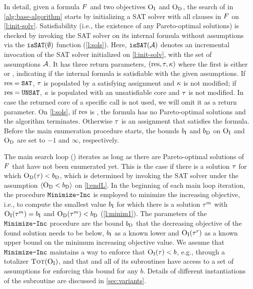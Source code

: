 In detail, given a formula $F$ and two objectives $\textsc{O}_{\text{I}}$ and $\textsc{O}_{\text{D}}$, the search of \algname{} in \cref{alg:base-algorithm} starts by initializing a SAT solver with all clauses in $F$ on \cref{l:init-solv}.
Satisfiability (i.e., the existence of any Pareto-optimal solutions) is checked by invoking the SAT solver on its internal formula without assumptions via the $\texttt{isSAT}(\emptyset)$ function (\cref{l:sols}).
Here, $\texttt{isSAT}(\mathcal{A})$ denotes an incremental invocation of the SAT solver initialized on \cref{l:init-solv}, with the set of assumptions $\mathcal{A}$.
It has three return parameters, $(\text{res},\tau,\kappa)$ where the first is either \sat{} or \unsat{}, indicating if the internal formula is satisfiable with the given assumptions.
If $\text{res}=\texttt{SAT}$, $\tau$ is populated by a satisfying assignment and $\kappa$ is not modified;
if $\text{res}=\texttt{UNSAT}$, $\kappa$ is populated with an unsatisfiable core and $\tau$ is not modified.
In case the returned core of a specific call is not used, we will omit it as a return parameter.
On \cref{l:sols}, if $\text{res}$ is \unsat{}, the formula has no Pareto-optimal solutions and the algorithm terminates.
Otherwise $\tau$ is an assignment that satisfies the formula.
Before the main enumeration procedure starts, the bounds $b_{\text{I}}$ and $b_{\text{D}}$ on $\textsc{O}_{\text{I}}$ and $\textsc{O}_{\text{D}}$ are set to $-1$ and $\infty$, respectively.

The main search loop () iterates as long as there are Pareto-optimal solutions of $F$ that have not been enumerated yet. 
This is the case if there is a solution $\tau$ for which $\textsc{O}_{\text{D}}(\tau) < b_{\text{D}}$, which is determined by invoking the SAT solver under the assumption $\langle \textsc{O}_{\text{D}} < b_{\text{D}} \rangle$ on \cref{l:endL}.
In the beginning of each main loop iteration, the procedure $\texttt{Minimize-\allowbreak{}Inc}$ is employed to minimize the increasing objective, i.e., to compute the smallest value $b_{\text{I}}$ for which there is a solution $\tau^m$ with $\textsc{O}_{\text{I}}(\tau^m) = b_{\text{I}}$ and $\textsc{O}_{\text{D}}(\tau^m) < b_{\text{D}}$ (\cref{l:minim1}). 
The parameters of the $\texttt{Minimize-\allowbreak{}Inc}$ procedure are the bound $b_{\text{D}}$ that the decreasing objective of the found solution needs to be below, $b_{\text{I}}$ as a known lower and $\textsc{O}_{\text{I}}(\tau^r)$ as a known upper bound on the minimum increasing objective value.
We assume that $\texttt{Minimize-\allowbreak{}Inc}$ maintains a way to enforce that $\textsc{O}_{\text{I}}(\tau) < b$, e.g., through a totalizer $\textsc{Tot}(\textsc{O}_{\text{I}})$, and that \algname{} and all of its subroutines have access to a set of assumptions for enforcing this bound for any $b$.
Details of different instantiations of the \Min{} subroutine are discussed in \cref{sec:variants}.

